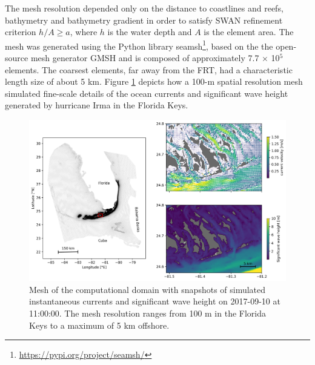 \documentclass[11pt,a4paper]{article}
\begin{document}
The mesh resolution depended only on the distance to coastlines and reefs, bathymetry and bathymetry gradient in order to satisfy SWAN refinement criterion $h/A\geq a$, where $h$ is the water depth and $A$ is the element area. The mesh was generated using the Python library seamsh\footnote{\url{https://pypi.org/project/seamsh/}}, based on the the open-source mesh generator GMSH \citep{geuzaine2009gmsh} and is composed of approximately 7.7 $\times$ 10$^5$ elements. The coarsest elements, far away from the FRT, had a characteristic length size of about 5 km. Figure \ref{fig:mesh} depicts how a 100-m spatial resolution mesh simulated fine-scale details of the ocean currents and significant wave height generated by hurricane Irma in the Florida Keys.

\begin{figure}
    \centering
    \includegraphics[width=.95\textwidth]{fig/fig_mesh_ww3.png}
    \caption{Mesh of the computational domain with snapshots of simulated instantaneous currents and significant wave height on 2017-09-10 at 11:00:00. The mesh resolution ranges from 100 m in the Florida Keys to a maximum of 5 km offshore.}
    \label{fig:mesh}
\end{figure}
\end{document}
